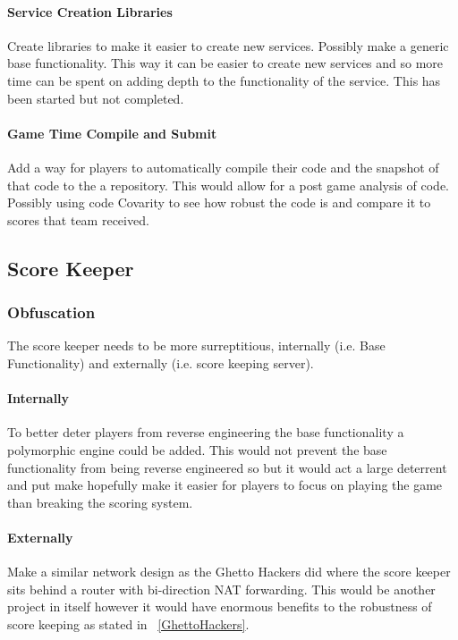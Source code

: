 \documentclass[10pt]{article}
\begin{document}
\paragraph*{Service Creation Libraries}
Create libraries to make it easier to create new services. Possibly make a generic base
functionality. This way it can be easier to create new services and so more time can
be spent on adding depth to the functionality of the service. This has been started
but not completed.

\paragraph*{Game Time Compile and Submit}
Add a way for players to automatically compile their code and the snapshot of that code
to the a repository. This would allow for a post game analysis of code. Possibly using
code Covarity to see how robust the code is and compare it to scores
that team received.

\subsection{Score Keeper}

\subsubsection{Obfuscation}
The score keeper needs to be more surreptitious, internally (i.e. Base Functionality) and
externally (i.e. score keeping server).

\paragraph*{Internally}
To better deter players from reverse engineering the base functionality a polymorphic 
engine could be added. This would not prevent the base functionality from being 
reverse engineered so but it would act a large deterrent and put make hopefully
make it easier for players to focus on playing the game than breaking the scoring system.

\paragraph*{Externally}
Make a similar network design as the Ghetto Hackers did \cite{BlackHat2004} where the score
keeper sits behind a router with bi-direction NAT forwarding. This would be another 
project in itself however it would have enormous benefits to the robustness of score keeping
as stated in ~\ref{GhettoHackers}.
\end{document}
